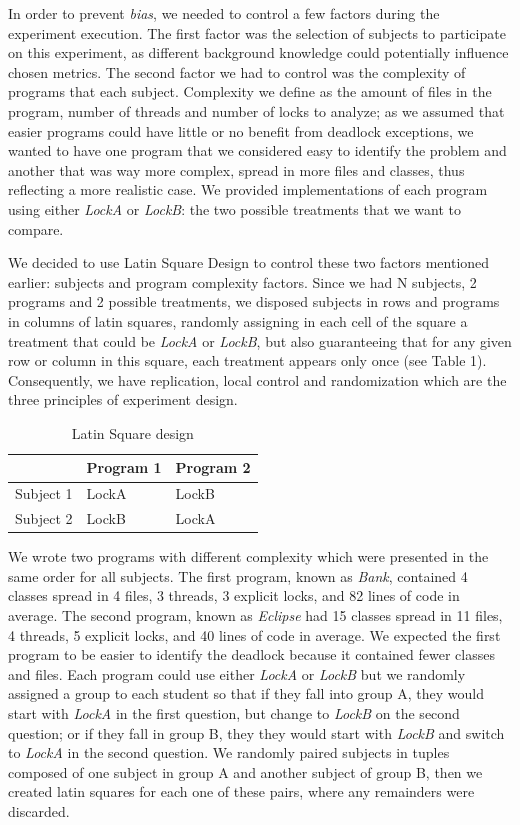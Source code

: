 In order to prevent \emph{bias}, we needed to control a few factors during the experiment execution. The first factor was the selection of subjects to participate on this experiment, as different background knowledge could potentially influence chosen metrics. The second factor we had to control was the complexity of programs that each subject. Complexity we define as the amount of files in the program, number of threads and number of locks to analyze; as we assumed that easier programs could have little or no benefit from deadlock exceptions, we wanted to have one program that we considered easy to identify the problem and another that was way more complex, spread in more files and classes, thus reflecting a more realistic case. We provided implementations of each program using either \emph{LockA} or \emph{LockB}: the two possible treatments that we want to compare.

We decided to use Latin Square Design to control these two factors mentioned earlier: subjects and program complexity factors. Since we had N subjects, 2 programs and 2 possible treatments, we disposed subjects in rows and programs in columns of latin squares, randomly assigning in each cell of the square a treatment that could be \emph{LockA} or \emph{LockB}, but also guaranteeing that for any given row or column in this square, each treatment appears only once (see Table 1). Consequently, we have replication, local control and randomization which are the three principles of experiment design. %

\begin{table}
\begin{center}
\caption{Latin Square design}
\begin{tabular}{|l|l|l|}
\hline
 & Program 1 & Program 2\\
\hline
Subject 1 & LockA & LockB\\
Subject 2 & LockB & LockA\\
\hline
\end{tabular}
\end{center}
\end{table}

We wrote two programs with different complexity which were presented in the same order for all subjects. The first program, known as \emph{Bank}, contained 4 classes spread in 4 files, 3 threads, 3 explicit locks, and 82 lines of code in average. The second program, known as \emph{Eclipse} had 15 classes spread in 11 files, 4 threads, 5 explicit locks, and 40 lines of code in average. We expected the first program to be easier to identify the deadlock because it contained fewer classes and files. Each program could use either \emph{LockA} or \emph{LockB} but we randomly assigned a group to each student so that if they fall into group A, they would start with \emph{LockA} in the first question, but change to \emph{LockB} on the second question; or if they fall in group B, they they would start with \emph{LockB} and switch to \emph{LockA} in the second question. We randomly paired subjects in tuples composed of one subject in group A and another subject of group B, then we created latin squares for each one of these pairs, where any remainders were discarded.

